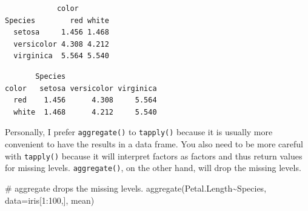 \documentclass[
  13,
  letterpaper,
]{report}
\newenvironment{Shaded}{\begin{snugshade}}{\end{snugshade}}
\newcommand{\AttributeTok}[1]{\textcolor[rgb]{0.40,0.45,0.13}{#1}}
\newcommand{\CommentTok}[1]{\textcolor[rgb]{0.37,0.37,0.37}{#1}}
\newcommand{\DecValTok}[1]{\textcolor[rgb]{0.68,0.00,0.00}{#1}}
\newcommand{\FunctionTok}[1]{\textcolor[rgb]{0.28,0.35,0.67}{#1}}
\newcommand{\NormalTok}[1]{\textcolor[rgb]{0.00,0.23,0.31}{#1}}
\newcommand{\SpecialCharTok}[1]{\textcolor[rgb]{0.37,0.37,0.37}{#1}}
\newcommand{\StringTok}[1]{\textcolor[rgb]{0.13,0.47,0.30}{#1}}
\begin{document}
\begin{Shaded}
\end{Shaded}

\begin{verbatim}
            color
Species        red white
  setosa     1.456 1.468
  versicolor 4.308 4.212
  virginica  5.564 5.540
\end{verbatim}

\begin{Shaded}
\end{Shaded}

\begin{Shaded}
\end{Shaded}

\begin{verbatim}
       Species
color   setosa versicolor virginica
  red    1.456      4.308     5.564
  white  1.468      4.212     5.540
\end{verbatim}

Personally, I prefer \texttt{aggregate()} to \texttt{tapply()} because
it is usually more convenient to have the results in a data frame. You
also need to be more careful with \texttt{tapply()} because it will
interpret factors as factors and thus return values for missing levels.
\texttt{aggregate()}, on the other hand, will drop the missing levels.

\begin{Shaded}
\begin{Highlighting}[]
\CommentTok{\# aggregate drops the missing levels.}
\FunctionTok{aggregate}\NormalTok{(Petal.Length}\SpecialCharTok{\textasciitilde{}}\NormalTok{Species, }\AttributeTok{data=}\NormalTok{iris[}\DecValTok{1}\SpecialCharTok{:}\DecValTok{100}\NormalTok{,], mean)}
\end{Highlighting}
\end{Shaded}
\end{document}
